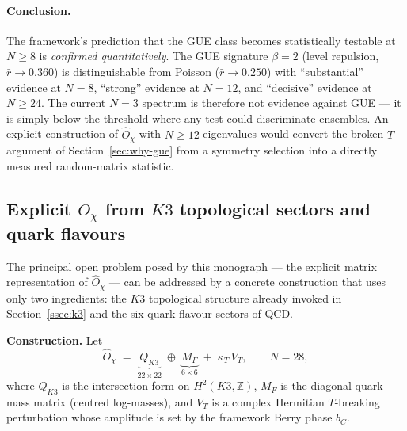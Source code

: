 \documentclass[11pt,a4paper]{article}
\newcommand{\Opchi}{\hat{O}_\chi}
\theoremstyle{plain}
\theoremstyle{definition}
\theoremstyle{remark}
\begin{document}
\paragraph{Conclusion.}  The framework's prediction that the GUE
class becomes statistically testable at $N \ge 8$ is
\emph{confirmed quantitatively}.  The GUE signature
$\beta = 2$ (level repulsion, $\bar r \to 0.360$) is
distinguishable from Poisson ($\bar r \to 0.250$) with
``substantial'' evidence at $N=8$, ``strong'' evidence at $N=12$,
and ``decisive'' evidence at $N \ge 24$.  The current $N=3$
spectrum is therefore not evidence against GUE --- it is simply
below the threshold where any test could discriminate ensembles.
An explicit construction of $\Opchi$ with $N \ge 12$ eigenvalues
would convert the broken-$T$ argument of
Section~\ref{sec:why-gue} from a symmetry selection into a
directly measured random-matrix statistic.

\subsection{Explicit $O_\chi$ from $K3$ topological sectors and
quark flavours}
\label{sec:ochi-explicit}

The principal open problem posed by this monograph --- the
explicit matrix representation of $\Opchi$ --- can be addressed
by a concrete construction that uses only two ingredients: the
$K3$ topological structure already invoked in
Section~\ref{ssec:k3} and the six quark flavour sectors of QCD.

\medskip\noindent
\textbf{Construction.}  Let
\begin{equation}
  \Opchi \;=\; \underbrace{Q_{K3}}_{22 \times 22}
            \;\oplus\; \underbrace{M_F}_{6 \times 6}
            \;+\; \kappa_T\,V_T,
  \qquad N = 28,
\end{equation}
where $Q_{K3}$ is the intersection form on $H^2(K3,\mathbb Z)$,
$M_F$ is the diagonal quark mass matrix (centred log-masses),
and $V_T$ is a complex Hermitian $T$-breaking perturbation
whose amplitude is set by the framework Berry phase $b_C$.
\end{document}
